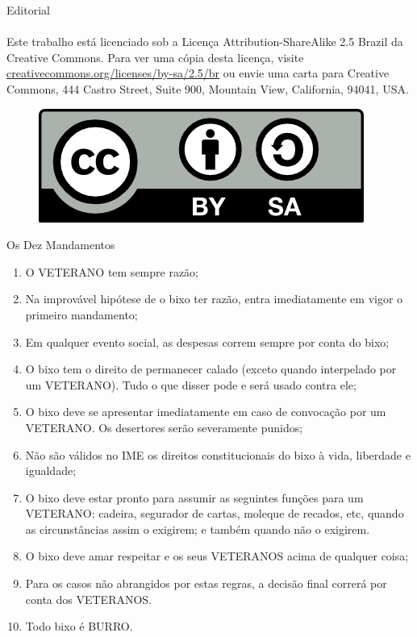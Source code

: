 \begin{secao}{Editorial}
\paragraph{}
Este trabalho está licenciado sob a Licença Attribution-ShareAlike 2.5 Brazil
da Creative Commons. Para ver uma cópia desta licença,
visite \url{creativecommons.org/licenses/by-sa/2.5/br} ou envie uma
carta para Creative Commons, 444 Castro Street, Suite 900, Mountain View,
California, 94041, USA.
\\
\begin{figure}[H]
    \centering
    \includegraphics{img/cc/by-sa.png}
\end{figure}

\pagebreak

\begin{subsecao}{Os Dez Mandamentos}
  \begin{enumerate}
  \item O VETERANO tem sempre razão;
  \item Na improvável hipótese de o bixo ter razão, entra imediatamente
        em vigor o primeiro mandamento;
  \item Em qualquer evento social, as despesas correm sempre por conta
        do bixo;
  \item O bixo tem o direito de permanecer calado (exceto quando interpelado
        por um VETERANO). Tudo o que disser pode e será usado contra ele;
  \item O bixo deve se apresentar imediatamente em caso de convocação por
        um VETERANO. Os desertores serão severamente punidos;
  \item Não são válidos no IME os direitos constitucionais do bixo à vida,
        liberdade e igualdade;
  \item O bixo deve estar pronto para assumir as seguintes funções para um
        VETERANO: cadeira, segurador de cartas, moleque de recados, etc, quando
        as circunstâncias assim o exigirem; e também quando não o exigirem.
  \item O bixo deve amar respeitar e os seus VETERANOS acima de qualquer
        coisa;
  \item Para os casos não abrangidos por estas regras, a decisão final
        correrá por conta dos VETERANOS.
  \item Todo bixo é BURRO.
  \end{enumerate}


\end{subsecao}
\end{secao}
